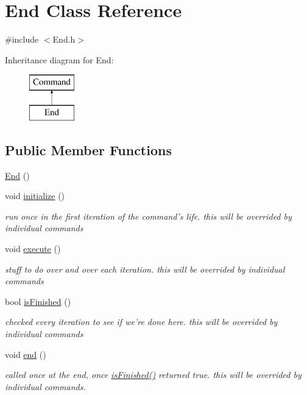 \hypertarget{classEnd}{\section{End Class Reference}
\label{classEnd}
}


{\ttfamily \#include $<$End.\-h$>$}

Inheritance diagram for End\-:\begin{figure}[H]
\begin{center}
\leavevmode
\includegraphics[height=2.000000cm]{classEnd}
\end{center}
\end{figure}
\subsection*{Public Member Functions}
\begin{DoxyCompactItemize}
\item 
\hyperlink{classEnd_acd25fa8f481c50f5b8eaff4af1159942}{End} ()
\item 
void \hyperlink{classEnd_a0f844207902db51f8992c2a1f23a47d9}{initialize} ()
\begin{DoxyCompactList}\small\item\em run once in the first iteration of the command's life. this will be overrided by individual commands \end{DoxyCompactList}\item 
void \hyperlink{classEnd_a45a7411a23472e3297b48b6760a0d331}{execute} ()
\begin{DoxyCompactList}\small\item\em stuff to do over and over each iteration. this will be overrided by individual commands \end{DoxyCompactList}\item 
bool \hyperlink{classEnd_a2e5c37f16b83f9e354b34ee3ed63aae8}{is\-Finished} ()
\begin{DoxyCompactList}\small\item\em checked every iteration to see if we're done here. this will be overrided by individual commands \end{DoxyCompactList}\item 
void \hyperlink{classEnd_a84e2ceb14d9465c580c162a26fa3e6de}{end} ()
\begin{DoxyCompactList}\small\item\em called once at the end, once \hyperlink{classEnd_a2e5c37f16b83f9e354b34ee3ed63aae8}{is\-Finished()} returned true. this will be overrided by individual commands. \end{DoxyCompactList}\end{DoxyCompactItemize}
